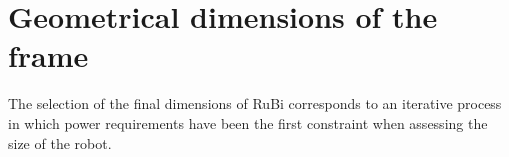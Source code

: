
\section{Geometrical dimensions of the frame} %
\label{sec:dimensions}

The selection of the final dimensions of RuBi corresponds to an iterative process in which power requirements have been the first constraint when assessing the size of the robot.





